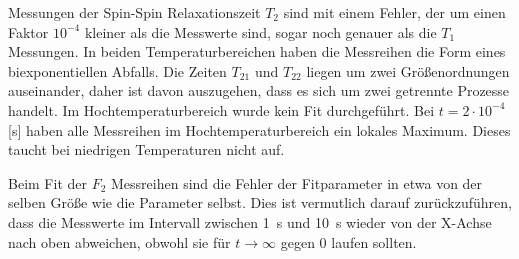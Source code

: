 Messungen der Spin-Spin Relaxationszeit $T_2$ sind mit einem Fehler, der um einen Faktor $10^{-4}$ kleiner als die Messwerte sind, sogar noch genauer als die $T_1$ Messungen. In beiden Temperaturbereichen haben die Messreihen die Form eines biexponentiellen Abfalls. Die Zeiten $T_{21}$ und $T_{22}$ liegen um zwei Größenordnungen auseinander, daher ist davon auszugehen, dass es sich um zwei getrennte Prozesse handelt.
Im Hochtemperaturbereich wurde kein Fit durchgeführt. Bei $t = 2\cdot 10^{-4}$ [s] haben alle Messreihen im Hochtemperaturbereich ein lokales Maximum. Dieses taucht bei niedrigen Temperaturen nicht auf.

Beim Fit der $F_2$ Messreihen sind die Fehler der Fitparameter in etwa von der selben Größe wie die Parameter selbst. Dies ist vermutlich darauf zurückzuführen, dass die Messwerte im Intervall zwischen \SI{1}{s} und \SI{10}{s} wieder von der X-Achse nach oben abweichen, obwohl sie für $t\rightarrow\infty$ gegen 0 laufen sollten.





